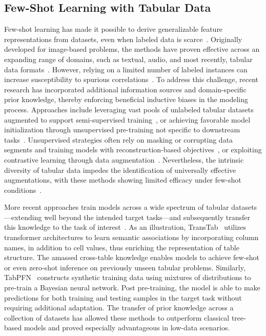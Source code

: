 \subsection{Few-Shot Learning with Tabular Data}  
Few-shot learning has made it possible to derive generalizable feature representations from datasets, even when labeled data is scarce~\cite{chen2018closer}. Originally developed for image-based problems, the methods have proven effective across an expanding range of domains, such as textual, audio, and most recently, tabular data formats~\cite{majumder2022few,nam2023stunt,schick2021exploiting}. However, relying on a limited number of labeled instances can increase susceptibility to spurious correlations~\cite{bartlett2021deep}. To address this challenge, recent research has incorporated additional information sources and domain-specific prior knowledge, thereby enforcing beneficial inductive biases in the modeling process. Approaches include leveraging vast pools of unlabeled tabular datasets augmented to support semi-supervised training~\cite{ucar2021subtab,yoon2020vime}, or achieving favorable model initialization through unsupervised pre-training not specific to downstream tasks~\cite{somepalli2021saint}. Unsupervised strategies often rely on masking or corrupting data segments and training models with reconstruction-based objectives~\cite{arik2021tabnet,majmundar2022met}, or exploiting contrastive learning through data augmentation~\cite{bahri2022scarf,chen2020simple}. Nevertheless, the intrinsic diversity of tabular data impedes the identification of universally effective augmentations, with these methods showing limited efficacy under few-shot conditions~\cite{nam2023stunt}.

More recent approaches train models across a wide spectrum of tabular datasets—extending well beyond the intended target tasks—and subsequently transfer this knowledge to the task of interest~\cite{zhang2023generative,levin2022transfer,zhu2023xtab}. As an illustration, TransTab~\cite{wang2022transtab} utilizes transformer architectures to learn semantic associations by incorporating column names, in addition to cell values, thus enriching the representation of table structure. The amassed cross-table knowledge enables models to achieve few-shot or even zero-shot inference on previously unseen tabular problems. Similarly, TabPFN~\cite{hollmann2022tabpfn} constructs synthetic training data using mixtures of distributions to pre-train a Bayesian neural network. Post pre-training, the model is able to make predictions for both training and testing samples in the target task without requiring additional adaptation. The transfer of prior knowledge across a collection of datasets has allowed these methods to outperform classical tree-based models and proved especially advantageous in low-data scenarios.

